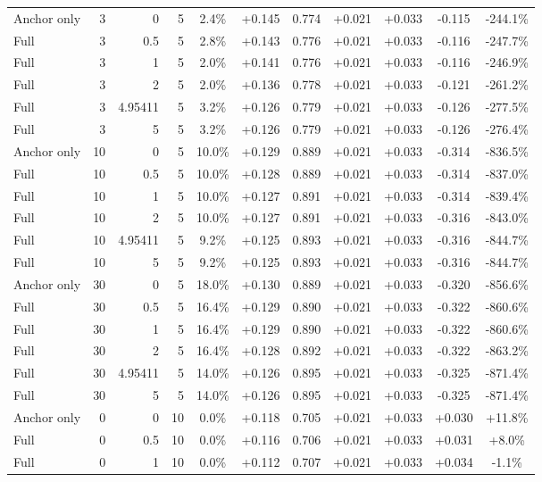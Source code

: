 \begin{table}[htbp]
\begin{tabular}{lrrrccccccc}
Anchor only & 3 & 0 & 5 & 2.4\% & +0.145 & 0.774 & +0.021 & +0.033 & -0.115 & -244.1\% \\
Full & 3 & 0.5 & 5 & 2.8\% & +0.143 & 0.776 & +0.021 & +0.033 & -0.116 & -247.7\% \\
Full & 3 & 1 & 5 & 2.0\% & +0.141 & 0.776 & +0.021 & +0.033 & -0.116 & -246.9\% \\
Full & 3 & 2 & 5 & 2.0\% & +0.136 & 0.778 & +0.021 & +0.033 & -0.121 & -261.2\% \\
Full & 3 & 4.95411 & 5 & 3.2\% & +0.126 & 0.779 & +0.021 & +0.033 & -0.126 & -277.5\% \\
Full & 3 & 5 & 5 & 3.2\% & +0.126 & 0.779 & +0.021 & +0.033 & -0.126 & -276.4\% \\
Anchor only & 10 & 0 & 5 & 10.0\% & +0.129 & 0.889 & +0.021 & +0.033 & -0.314 & -836.5\% \\
Full & 10 & 0.5 & 5 & 10.0\% & +0.128 & 0.889 & +0.021 & +0.033 & -0.314 & -837.0\% \\
Full & 10 & 1 & 5 & 10.0\% & +0.127 & 0.891 & +0.021 & +0.033 & -0.314 & -839.4\% \\
Full & 10 & 2 & 5 & 10.0\% & +0.127 & 0.891 & +0.021 & +0.033 & -0.316 & -843.0\% \\
Full & 10 & 4.95411 & 5 & 9.2\% & +0.125 & 0.893 & +0.021 & +0.033 & -0.316 & -844.7\% \\
Full & 10 & 5 & 5 & 9.2\% & +0.125 & 0.893 & +0.021 & +0.033 & -0.316 & -844.7\% \\
Anchor only & 30 & 0 & 5 & 18.0\% & +0.130 & 0.889 & +0.021 & +0.033 & -0.320 & -856.6\% \\
Full & 30 & 0.5 & 5 & 16.4\% & +0.129 & 0.890 & +0.021 & +0.033 & -0.322 & -860.6\% \\
Full & 30 & 1 & 5 & 16.4\% & +0.129 & 0.890 & +0.021 & +0.033 & -0.322 & -860.6\% \\
Full & 30 & 2 & 5 & 16.4\% & +0.128 & 0.892 & +0.021 & +0.033 & -0.322 & -863.2\% \\
Full & 30 & 4.95411 & 5 & 14.0\% & +0.126 & 0.895 & +0.021 & +0.033 & -0.325 & -871.4\% \\
Full & 30 & 5 & 5 & 14.0\% & +0.126 & 0.895 & +0.021 & +0.033 & -0.325 & -871.4\% \\
Anchor only & 0 & 0 & 10 & 0.0\% & +0.118 & 0.705 & +0.021 & +0.033 & +0.030 & +11.8\% \\
Full & 0 & 0.5 & 10 & 0.0\% & +0.116 & 0.706 & +0.021 & +0.033 & +0.031 & +8.0\% \\
Full & 0 & 1 & 10 & 0.0\% & +0.112 & 0.707 & +0.021 & +0.033 & +0.034 & -1.1\% \\

\end{tabular}
\end{table}
